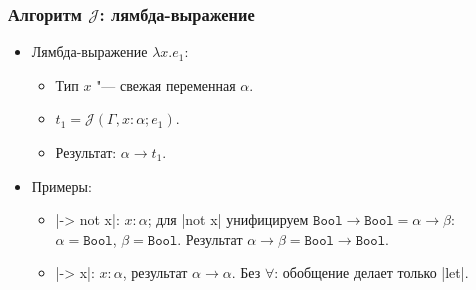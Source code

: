 \documentclass[11pt]{beamer}
\newcommand{\tBool}{\mathtt{Bool}}
\newcommand{\J}{\mathcal{J}}
\begin{document}
\begin{frame}[fragile]
  \frametitle{Алгоритм $\J$: лямбда-выражение}
  \begin{itemize}
    \item Лямбда-выражение $\lambda x.e_1$:
          \begin{itemize}
            \item Тип $x$ "--- свежая переменная $\alpha$.
            \item $t_1 = \J(\Gamma, x : \alpha; e_1)$.
            \item Результат: \pause $\alpha \to t_1$.
          \end{itemize}
          \pause
    \item Примеры:
          \begin{itemize}
            \item \haskinline|\x -> not x|: \pause $x : \alpha$; для \haskinline|not x| унифицируем $\tBool \to \tBool = \alpha \to \beta$: $\alpha = \tBool$, $\beta = \tBool$. Результат \pause $\alpha \to \beta = \tBool \to \tBool$.
                  \pause
            \item \haskinline|\x -> x|: \pause $x : \alpha$, результат $\alpha \to \alpha$. Без $\forall$: обобщение делает только \haskinline|let|.
          \end{itemize}
  \end{itemize}
\end{frame}
\end{document}
